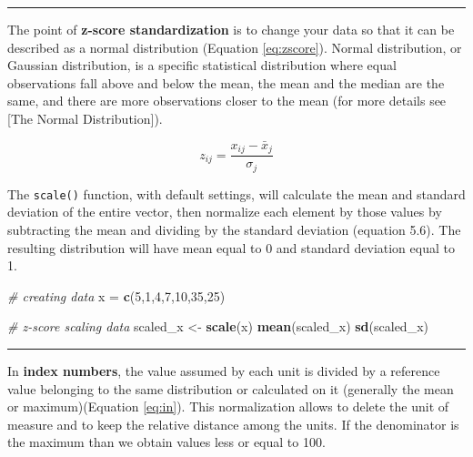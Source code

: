 \documentclass[
]{svmono}
\newenvironment{Shaded}{\begin{snugshade}}{\end{snugshade}}
\newcommand{\CommentTok}[1]{\textcolor[rgb]{0.56,0.35,0.01}{\textit{#1}}}
\newcommand{\DecValTok}[1]{\textcolor[rgb]{0.00,0.00,0.81}{#1}}
\newcommand{\FunctionTok}[1]{\textcolor[rgb]{0.13,0.29,0.53}{\textbf{#1}}}
\newcommand{\NormalTok}[1]{#1}
\newcommand{\OtherTok}[1]{\textcolor[rgb]{0.56,0.35,0.01}{#1}}
\begin{document}
\begin{center}\rule{0.5\linewidth}{0.5pt}\end{center}

The point of \textbf{z-score standardization} is to change your data so that
it can be described as a normal distribution (Equation \eqref{eq:zscore}). Normal distribution, or
Gaussian distribution, is a specific statistical distribution where
equal observations fall above and below the mean, the mean and the
median are the same, and there are more observations closer to the mean
(for more details see {[}The Normal Distribution{]}).

\begin{equation}
z_{ij}=\frac{x_{ij}-\bar x_j}{\sigma_j}
\label{eq:zscore}
\end{equation}

The \texttt{scale()} function, with default settings, will calculate the mean
and standard deviation of the entire vector, then normalize each element
by those values by subtracting the mean and dividing by the standard
deviation (equation 5.6). The resulting distribution will have mean
equal to 0 and standard deviation equal to 1.

\begin{Shaded}
\begin{Highlighting}[]
\CommentTok{\# creating data}
\NormalTok{x }\OtherTok{=} \FunctionTok{c}\NormalTok{(}\DecValTok{5}\NormalTok{,}\DecValTok{1}\NormalTok{,}\DecValTok{4}\NormalTok{,}\DecValTok{7}\NormalTok{,}\DecValTok{10}\NormalTok{,}\DecValTok{35}\NormalTok{,}\DecValTok{25}\NormalTok{)}

\CommentTok{\# z{-}score scaling data}
\NormalTok{scaled\_x }\OtherTok{\textless{}{-}} \FunctionTok{scale}\NormalTok{(x)}
\FunctionTok{mean}\NormalTok{(scaled\_x)}
\FunctionTok{sd}\NormalTok{(scaled\_x)}
\end{Highlighting}
\end{Shaded}

\begin{center}\rule{0.5\linewidth}{0.5pt}\end{center}

In \textbf{index numbers}, the value assumed by each unit is divided by a
reference value belonging to the same distribution or calculated on it
(generally the mean or maximum)(Equation \eqref{eq:in}). This normalization allows
to delete the unit of measure and to keep the relative distance among
the units. If the denominator is the maximum than we obtain values less
or equal to 100.
\end{document}
